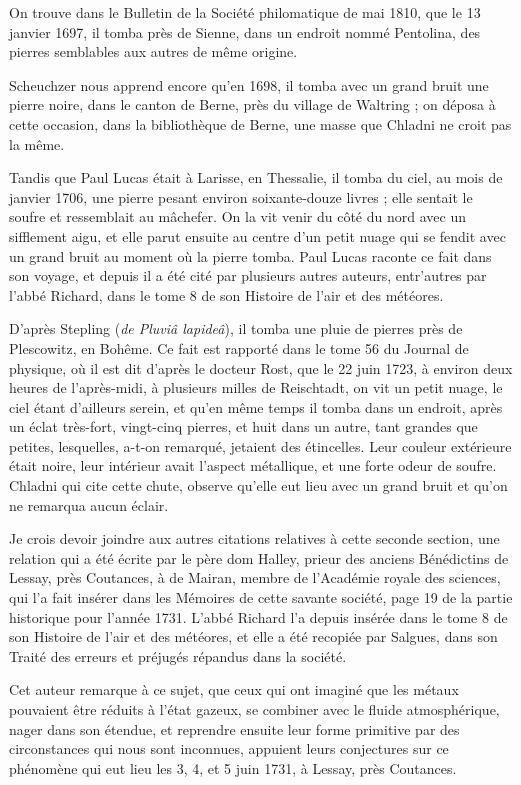 \documentclass[a4paper, 12pt, oneside, french]{article}
\begin{document}
On trouve dans le Bulletin de la Société philomatique de mai 1810, que le 13 janvier 1697, il tomba près de Sienne, dans un endroit nommé Pentolina, des pierres semblables aux autres de même origine.

Scheuchzer nous apprend encore qu'en 1698, il tomba avec un grand bruit une pierre noire, dans le canton de Berne, près du village de Waltring ; on déposa à cette occasion, dans la bibliothèque de Berne, une masse que Chladni ne croit pas la même.

Tandis que Paul Lucas était à Larisse, en Thessalie, il tomba du ciel, au mois de janvier 1706, une pierre pesant environ soixante-douze livres ; elle sentait le soufre et ressemblait au mâchefer. On la vit venir du côté du nord avec un sifflement aigu, et elle parut ensuite au centre d'un petit nuage qui se fendit avec un grand bruit au moment où la pierre tomba. Paul Lucas raconte ce fait dans son voyage, et depuis il a été cité par plusieurs autres auteurs, entr'autres par l'abbé Richard, dans le tome 8 de son Histoire de l'air et des météores.

D'après Stepling (\emph{de Pluviâ lapideâ}), il tomba une pluie de pierres près de Plescowitz, en Bohême. Ce fait est rapporté dans le tome 56 du Journal de physique, où il est dit d'après le docteur Rost, que le 22 juin 1723, à environ deux heures de l'après-midi, à plusieurs milles de Reischtadt, on vit un petit nuage, le ciel étant d'ailleurs serein, et qu'en même temps il tomba dans un endroit, après un éclat très-fort, vingt-cinq pierres, et huit dans un autre, tant grandes que petites, lesquelles, a-t-on remarqué, jetaient des étincelles. Leur couleur extérieure était noire, leur intérieur avait l'aspect métallique, et une forte odeur de soufre. Chladni qui cite cette chute, observe qu'elle eut lieu avec un grand bruit et qu'on ne remarqua aucun éclair.

Je crois devoir joindre aux autres citations relatives à cette seconde section, une relation qui a été écrite par le père dom Halley, prieur des anciens Bénédictins de Lessay, près Coutances, à de Mairan, membre de l'Académie royale des sciences, qui l'a fait insérer dans les Mémoires de cette savante société, page 19 de la partie historique pour l'année 1731. L'abbé Richard l'a depuis insérée dans le tome 8 de son Histoire de l'air et des météores, et elle a été recopiée par Salgues, dans son Traité des erreurs et préjugés répandus dans la société.

Cet auteur remarque à ce sujet, que ceux qui ont imaginé que les métaux pouvaient être réduits à l'état gazeux, se combiner avec le fluide atmosphérique, nager dans son étendue, et reprendre ensuite leur forme primitive par des circonstances qui nous sont inconnues, appuient leurs conjectures sur ce phénomène qui eut lieu les 3, 4, et 5 juin 1731, à Lessay, près Coutances.
\end{document}
